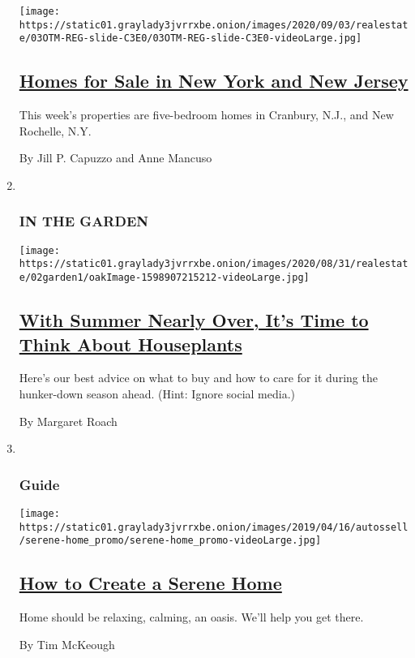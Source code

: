 \begin{enumerate}
  \texttt{[image: https://static01.graylady3jvrrxbe.onion/images/2020/09/03/realestate/03OTM-REG-slide-C3E0/03OTM-REG-slide-C3E0-videoLarge.jpg]}

  \hypertarget{homes-for-sale-in-new-york-and-new-jersey}{%
  \subsection{\texorpdfstring{\href{/2020/09/03/realestate/homes-for-sale-in-new-york-and-new-jersey.html}{Homes
  for Sale in New York and New
  Jersey}}{Homes for Sale in New York and New Jersey}}\label{homes-for-sale-in-new-york-and-new-jersey}}

  This week's properties are five-bedroom homes in Cranbury, N.J., and
  New Rochelle, N.Y.

  By Jill P. Capuzzo and Anne Mancuso
\item ~
  \hypertarget{in-the-garden}{%
  \subsubsection{IN THE GARDEN}\label{in-the-garden}}

  \texttt{[image: https://static01.graylady3jvrrxbe.onion/images/2020/08/31/realestate/02garden1/oakImage-1598907215212-videoLarge.jpg]}

  \hypertarget{with-summer-nearly-over-its-time-to-think-about-houseplants}{%
  \subsection{\texorpdfstring{\href{/2020/09/02/realestate/houseplants-fall.html}{With
  Summer Nearly Over, It's Time to Think About
  Houseplants}}{With Summer Nearly Over, It's Time to Think About Houseplants}}\label{with-summer-nearly-over-its-time-to-think-about-houseplants}}

  Here's our best advice on what to buy and how to care for it during
  the hunker-down season ahead. (Hint: Ignore social media.)

  By Margaret Roach
\item ~
  \hypertarget{guide}{%
  \subsubsection{Guide}\label{guide}}

  \texttt{[image: https://static01.graylady3jvrrxbe.onion/images/2019/04/16/autossell/serene-home\_promo/serene-home\_promo-videoLarge.jpg]}

  \hypertarget{how-to-create-a-serene-home}{%
  \subsection{\texorpdfstring{\href{/interactive/2019/05/15/smarter-living/serene-home.html}{How
  to Create a Serene
  Home}}{How to Create a Serene Home}}\label{how-to-create-a-serene-home}}

  Home should be relaxing, calming, an oasis. We'll help you get there.

  By Tim McKeough
\end{enumerate}

